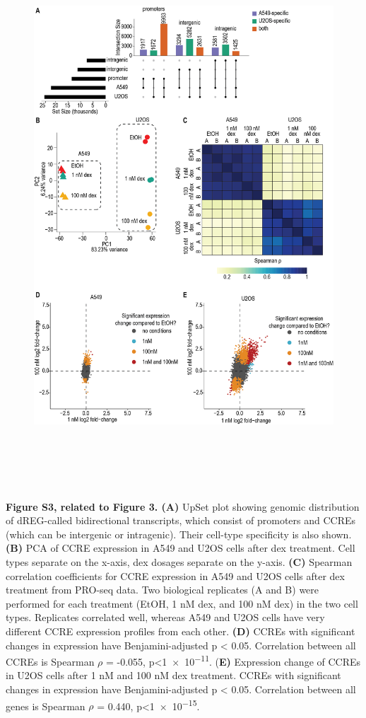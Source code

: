 \documentclass{article}
\begin{document}
\begin{figure}[ht!]
\includegraphics[height=8in]{figures/FigureS3_2021-04.png}
\label{fig:figS3}
\end{figure}

\textbf{Figure S3, related to Figure 3.  (A)} UpSet plot showing genomic distribution of dREG-called bidirectional transcripts, which consist of promoters and CCREs (which can be intergenic or intragenic). Their cell-type specificity is also shown. \textbf{(B)} PCA of CCRE expression in A549 and U2OS cells after dex treatment. Cell types separate on the x-axis, dex dosages separate on the y-axis. \textbf{(C)} Spearman correlation coefficients for CCRE expression in A549 and U2OS cells after dex treatment from PRO-seq data. Two biological replicates (A and B) were performed for each treatment (EtOH, 1 nM dex, and 100 nM dex) in the two cell types. Replicates correlated well, whereas A549 and U2OS cells have very different CCRE expression profiles from each other. \textbf{(D)} CCREs with significant changes in expression have Benjamini-adjusted p < 0.05. Correlation between all CCREs is Spearman $\rho$ = -0.055, p<\num{1e-11}. (\textbf{E)} Expression change of CCREs in U2OS cells after 1 nM and 100 nM dex treatment. CCREs with significant changes in expression have Benjamini-adjusted p < 0.05. Correlation between all genes is Spearman $\rho$ = 0.440, p<\num{1e-15}.
\end{document}
